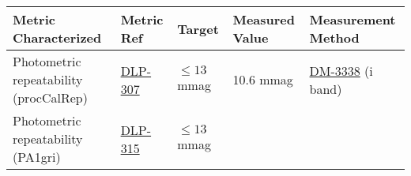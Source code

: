 \begin{longtable}[]{@{}lllll@{}}
\toprule
\begin{minipage}[b]{0.25\columnwidth}\raggedright\strut
Metric Characterized\strut
\end{minipage} & \begin{minipage}[b]{0.11\columnwidth}\raggedright\strut
Metric Ref\strut
\end{minipage} & \begin{minipage}[b]{0.20\columnwidth}\raggedright\strut
Target\strut
\end{minipage} & \begin{minipage}[b]{0.11\columnwidth}\raggedright\strut
Measured Value\strut
\end{minipage} & \begin{minipage}[b]{0.19\columnwidth}\raggedright\strut
Measurement Method\strut
\end{minipage}\tabularnewline
\midrule
\endhead
\begin{minipage}[t]{0.25\columnwidth}\raggedright\strut
Photometric repeatability (procCalRep)\strut
\end{minipage} & \begin{minipage}[t]{0.11\columnwidth}\raggedright\strut
\href{https://jira.lsstcorp.org/browser/DLP-307}{DLP-307}\strut
\end{minipage} & \begin{minipage}[t]{0.20\columnwidth}\raggedright\strut
\(\leq 13\) mmag\strut
\end{minipage} & \begin{minipage}[t]{0.11\columnwidth}\raggedright\strut
10.6 mmag\strut
\end{minipage} & \begin{minipage}[t]{0.19\columnwidth}\raggedright\strut
\href{https://jira.lsstcorp.org/browse/DM-3338}{DM-3338} (i band)\strut
\end{minipage}\tabularnewline
\begin{minipage}[t]{0.25\columnwidth}\raggedright\strut
Photometric repeatability (PA1gri)\strut
\end{minipage} & \begin{minipage}[t]{0.11\columnwidth}\raggedright\strut
\href{https://jira.lsstcorp.org/browser/DLP-315}{DLP-315}\strut
\end{minipage} & \begin{minipage}[t]{0.20\columnwidth}\raggedright\strut
\(\leq 13\) mmag\strut
\end{minipage} & \begin{minipage}[t]{0.11\columnwidth}\raggedright\strut

\end{minipage}
\end{longtable}
